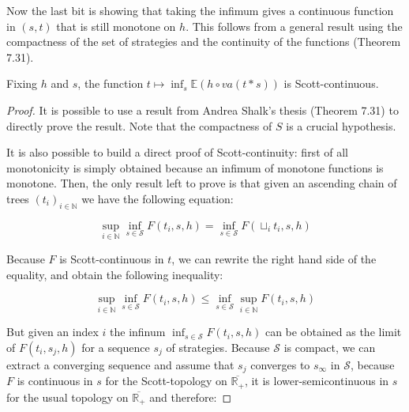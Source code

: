 Now the last bit is showing that taking the infimum gives 
a continuous function in $(s,t)$ that is still monotone on $h$.
This follows from a general result using the compactness of the 
set of strategies and the continuity of the functions 
\cite{AndreaShalk} (Theorem 7.31).

\begin{ensps}
\begin{alemma}
    \label{lem:mixedscottcontinuous}
    Fixing $h$ and $s$, 
    the function $t \mapsto \inf_s \mathbb{E} (h \circ va(t*s))$
    is Scott-continuous.
\end{alemma}

\begin{proof}
    It is possible to use a result from Andrea Shalk's thesis 
    \cite{AndreaShalk} (Theorem 7.31)
    to directly prove the result. Note that 
    the compactness of $S$ is a crucial hypothesis. 

    It is also possible to build a direct proof of Scott-continuity:
    first of all monotonicity is simply obtained because an infimum 
    of monotone functions is monotone. Then, the only result left 
    to prove is that given an ascending chain of trees $(t_i)_{i \in \mathbb{N}}$
    we have the following equation:

    \begin{equation*}
        \sup_{i \in \mathbb{N}} \inf_{s \in \mathcal{S}} F(t_i,s,h) = 
    \inf_{s \in \mathcal{S}} F (\sqcup_i t_i, s, h)
    \end{equation*}
    
    Because $F$ is Scott-continuous in $t$, we can rewrite the right hand 
    side of the equality, and obtain the following inequality: 

    \begin{equation*}
        \sup_{i \in \mathbb{N}} \inf_{s \in \mathcal{S}} F(t_i,s,h) \leq 
        \inf_{s \in \mathcal{S}} \sup_{i \in \mathbb{N}} F (t_i, s, h)
    \end{equation*}
    
    But given an index $i$ the infinum $\inf_{s \in \mathcal{S}} F(t_i,s,h)$ 
    can be obtained as the limit of $F(t_i,s_j,h)$ for a sequence $s_j$ of
    strategies.
    Because 
    $\mathcal{S}$ is compact, we can extract a converging sequence and 
    assume that $s_j$ converges to $s_\infty$ in $\mathcal{S}$, because 
    $F$ is continuous in $s$ for the Scott-topology on
    $\overline{\mathbb{R}_+}$, it is lower-semicontinuous in $s$ 
    for the usual topology on $\overline{\mathbb{R}_+}$ and therefore:


\end{proof}
\end{ensps}
